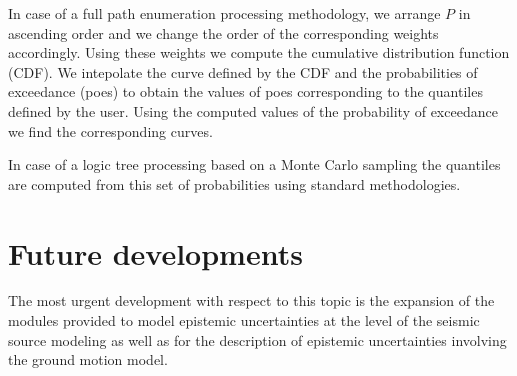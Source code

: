 In case of a full path enumeration processing methodology, we arrange $P$
in ascending order and we change the order of the corresponding 
weights accordingly. Using these weights we compute the cumulative 
distribution function (CDF). 
%
We intepolate the curve defined by the CDF and the probabilities of 
exceedance (poes) to obtain the values of poes corresponding to the 
quantiles defined by the user. 
%
Using the computed values of the probability of exceedance we find 
the corresponding curves.

In case of a logic tree processing based on a Monte Carlo sampling the 
quantiles are computed from this set of probabilities using standard
methodologies.
%
\section{Future developments}
%
The most urgent development with respect to this topic is the expansion of the
modules provided to model epistemic uncertainties at the level of the seismic
source modeling as well as for the description of epistemic uncertainties
involving the ground motion model.
